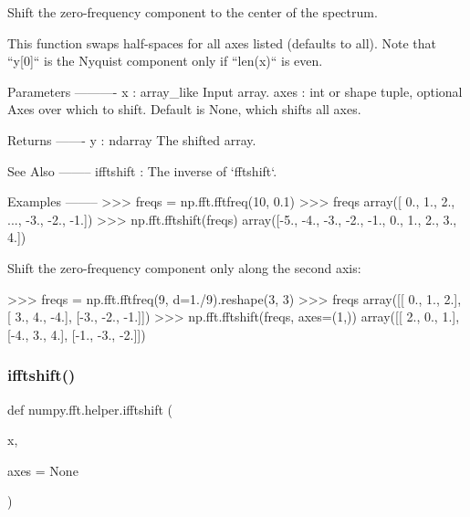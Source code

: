 \begin{DoxyVerb}Shift the zero-frequency component to the center of the spectrum.

This function swaps half-spaces for all axes listed (defaults to all).
Note that ``y[0]`` is the Nyquist component only if ``len(x)`` is even.

Parameters
----------
x : array_like
    Input array.
axes : int or shape tuple, optional
    Axes over which to shift.  Default is None, which shifts all axes.

Returns
-------
y : ndarray
    The shifted array.

See Also
--------
ifftshift : The inverse of `fftshift`.

Examples
--------
>>> freqs = np.fft.fftfreq(10, 0.1)
>>> freqs
array([ 0.,  1.,  2., ..., -3., -2., -1.])
>>> np.fft.fftshift(freqs)
array([-5., -4., -3., -2., -1.,  0.,  1.,  2.,  3.,  4.])

Shift the zero-frequency component only along the second axis:

>>> freqs = np.fft.fftfreq(9, d=1./9).reshape(3, 3)
>>> freqs
array([[ 0.,  1.,  2.],
       [ 3.,  4., -4.],
       [-3., -2., -1.]])
>>> np.fft.fftshift(freqs, axes=(1,))
array([[ 2.,  0.,  1.],
       [-4.,  3.,  4.],
       [-1., -3., -2.]])\end{DoxyVerb}
 \mbox{\label{namespacenumpy_1_1fft_1_1helper_a1aaac43e8e845143819108dd36806bdb}} 
\subsubsection{\texorpdfstring{ifftshift()}{ifftshift()}}
{\footnotesize\ttfamily def numpy.\+fft.\+helper.\+ifftshift (\begin{DoxyParamCaption}\item[{}]{x,  }\item[{}]{axes = {\ttfamily None} }\end{DoxyParamCaption})}


